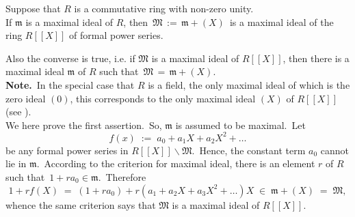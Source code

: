 \documentclass[12pt]{article}
\theoremstyle{definition}
\begin{document}
Suppose that $R$ is a commutative ring with non-zero unity.\\

If $\mathfrak{m}$ is a maximal ideal of $R$, then\, $\mathfrak{M} \,:=\, \mathfrak{m}\!+\!(X)$\, is a maximal ideal of the ring $R[[X]]$ of formal power series.

Also the converse is true, i.e. if $\mathfrak{M}$ is a maximal ideal of $R[[X]]$, then there is a maximal ideal 
$\mathfrak{m}$ of $R$ such that\, $\mathfrak{M} \,=\, \mathfrak{m}\!+\!(X)$.\\


\textbf{Note.}\, In the special case that $R$ is a field, the only maximal ideal of which is the zero ideal $(0)$, this corresponds to the only maximal ideal $(X)$ of $R[[X]]$ (see ).\\


We here prove the first assertion.\, So, $\mathfrak{m}$ is assumed to be maximal.\, Let 
$$f(x) \;:=\; a_0\!+\!a_1X\!+\!a_2X^2\!+\ldots$$
be any formal power series in $R[[X]]\!\smallsetminus\!\mathfrak{M}$.\, Hence, the constant term $a_0$ cannot lie in $\mathfrak{m}$.\, According to the criterion for maximal ideal, there is an element $r$ of $R$ such that\, $1\!+\!ra_0 \in \mathfrak{m}$.\, Therefore
$$1\!+\!rf(X) \;=\; (1\!+\!ra_0)\!+\!r(a_1\!+\!a_2X\!+\!a_3X^2\!+\ldots)X \;\in\;\mathfrak{m}\!+\!(X)
 \;=\; \mathfrak{M},$$
whence the same criterion says that $\mathfrak{M}$ is a maximal ideal of $R[[X]]$.

\end{document}
